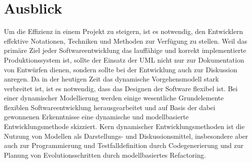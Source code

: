\chapter{Ausblick}

Um die Effizienz in einem Projekt zu steigern, ist es notwendig, den Entwicklern effektive Notationen, Techniken und Methoden zur Verfügung zu stellen. Weil das primäre Ziel jeder Softwareentwicklung das lauffähige und korrekt implementierte Produktionssystem ist, sollte der Einsatz der UML nicht nur zur Dokumentation von Entwürfen dienen, sondern sollte bei der Entwicklung auch zur Diskussion anregen. Da in der heutigen Zeit das dynamische Vorgehensmodell stark verbreitet ist, ist es notwendig, dass das Designen der Software flexibel ist. Bei einer dynamischer Modellierung werden einige wesentliche Grundelemente flexiblen Softwareentwicklung herausgearbeitet und auf Basis der dabei gewonnenen Erkenntnisse eine dynamische und modellbasierte Entwicklungsmethode skizziert. Kern dynamischer Entwicklungsmethoden ist die Nutzung von Modellen als Darstellungs- und Diskussionsmittel, insbesondere aber auch zur Programmierung und Testfalldefinition durch Codegenerierung und zur Planung von Evolutionsschritten durch modellbasiertes Refactoring.